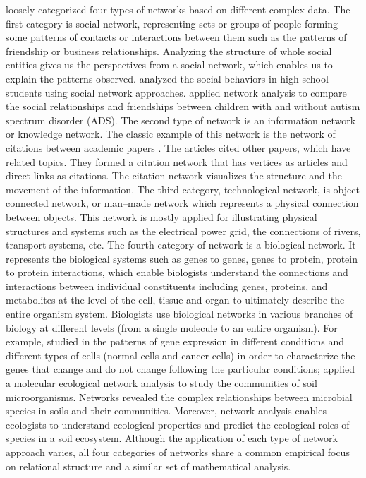  loosely categorized four types of networks based on different complex data. The first category is social network, representing sets or groups of people forming some patterns of contacts or interactions between them such as the patterns of friendship or business relationships. Analyzing the structure of whole social entities gives us the perspectives from a social network, which enables us to explain the patterns observed.  analyzed the social behaviors in high school students using social network approaches.  applied network analysis to compare the social relationships and friendships between children with and without autism spectrum disorder (ADS). The second type of network is an information network or knowledge network. The classic example of this network is the network of citations between academic papers . The articles cited other papers, which have related topics. They formed a citation network that has vertices as articles and direct links as citations. The citation network visualizes the structure and the movement of the information. The third category, technological network, is object connected network, or man--made network which represents a physical connection between objects. This network is mostly applied for illustrating physical structures and systems such as the electrical power grid, the connections of rivers, transport systems, etc. The fourth category of network is a biological network. It represents the biological systems such as genes to genes, genes to protein, protein to protein interactions, which enable biologists understand the connections and interactions between individual constituents including genes, proteins, and metabolites at the level of the cell, tissue and organ to ultimately describe the entire organism system. Biologists use biological networks in various branches of biology at different levels (from a single molecule to an entire organism). For example,  studied in the patterns of gene expression in different conditions and different types of cells (normal cells and cancer cells) in order to characterize the genes that change and do not change following the particular conditions;  applied a molecular ecological network analysis to study the communities of soil microorganisms. Networks revealed the complex relationships between microbial species in soils and their communities. Moreover, network analysis enables ecologists to understand ecological properties and predict the ecological roles of species in a soil ecosystem. Although the application of each type of network approach varies, all four categories of networks share a common empirical focus on relational structure and a similar set of mathematical analysis. 


